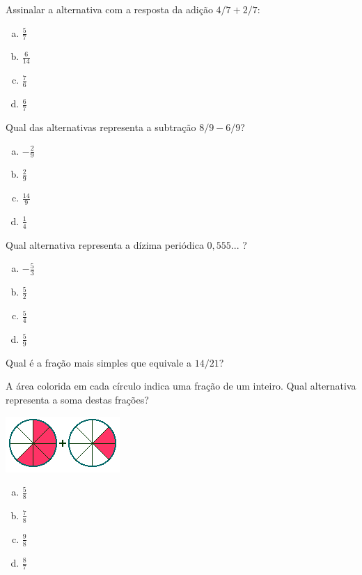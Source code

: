 \item Assinalar a alternativa com a resposta da adição $4/7+2/7$:
\begin{multicols}{4}
\begin{enumerate}[a)]
	\item $\displaystyle\frac{5}{7}$
	\item $\displaystyle\frac{6}{14}$
	\item $\displaystyle\frac{7}{6}$
	\item $\displaystyle\frac{6}{7}$	
\end{enumerate}
\end{multicols}

\item Qual das alternativas representa a subtração $8/9-6/9$?
\begin{multicols}{4}
\begin{enumerate}[a)]
	\item $-\displaystyle\frac{2}{9}$
	\item $\displaystyle\frac{2}{9}$
	\item $\displaystyle\frac{14}{9}$
	\item $\displaystyle\frac{1}{4}$	
\end{enumerate}
\end{multicols}

\item Qual alternativa representa a dízima periódica $0,555...$ ?
\begin{multicols}{4}
\begin{enumerate}[a)]
	\item $-\displaystyle\frac{5}{3}$
	\item $\displaystyle\frac{5}{2}$
	\item $\displaystyle\frac{5}{4}$
	\item $\displaystyle\frac{5}{9}$	
\end{enumerate}
\end{multicols}

\item Qual é a fração mais simples que equivale a $14/21$?

\item A área colorida em cada círculo indica uma fração de um inteiro. Qual alternativa representa a soma destas frações?
\begin{center}
\includegraphics[scale=1]{figuras/fig99.png}
\end{center}
\begin{multicols}{4}
\begin{enumerate}[a)]
	\item $\displaystyle\frac{5}{8}$
	\item $\displaystyle\frac{7}{8}$
	\item $\displaystyle\frac{9}{8}$
	\item $\displaystyle\frac{8}{7}$
\end{enumerate}
\end{multicols}


